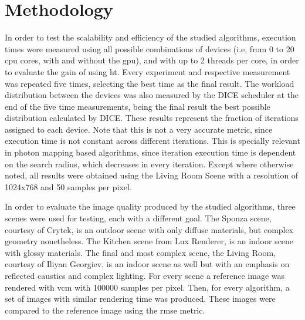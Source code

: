 


\section{Methodology}

In order to test the scalability and efficiency of the studied algorithms, execution times were measured using all possible combinations of devices (i.e, from 0 to 20 \gls{cpu} cores, with and without the \gls{gpu}), and with up to 2 threads per core, in order to evaluate the gain of using \gls{ht}. Every experiment and respective measurement was repeated five times, selecting the best time as the final result. The workload distribution between the devices was also measured by the DICE scheduler at the end of the five time measurements, being the final result the best possible distribution calculated by DICE. These results represent the fraction of iterations assigned to each device. Note that this is not a very accurate metric, since execution time is not constant across different iterations. This is specially relevant in photon mapping based algorithms, since iteration execution time is dependent on the search radius, which decreases in every iteration. Except where otherwise noted, all results were obtained using the Living Room Scene with a resolution of 1024x768 and 50 samples per pixel.

In order to evaluate the image quality produced by the studied algorithms, three scenes were used for testing, each with a different goal. The Sponza scene, courtesy of Crytek, is an outdoor scene with only diffuse materials, but complex geometry nonetheless. The Kitchen scene from Lux Renderer, is an indoor scene with glossy materials. The final and most complex scene, the Living Room, courtesy of Iliyan Georgiev, is an indoor scene as well but with an emphasis on reflected caustics and complex lighting. For every scene a reference image was rendered with \gls{vcm} with 100000 samples per pixel. Then, for every algorithm, a set of images with similar rendering time was produced. These images were compared to the reference image using the \gls{rmse} metric.

